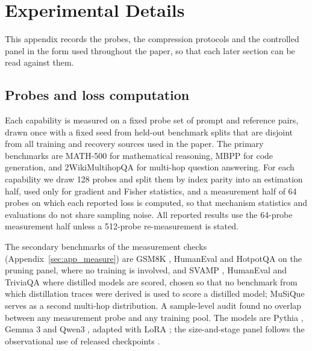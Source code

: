 \section{Experimental Details}
\label{sec:app_details}

This appendix records the probes, the compression protocols and the controlled panel in the form
used throughout the paper, so that each later section can be read against them. 


\subsection{Probes and loss computation}
\label{sec:app_probes}

Each capability is measured on a fixed probe set of prompt and reference pairs, drawn once with a
fixed seed from held-out benchmark splits that are disjoint from all training and recovery sources
used in the paper. The primary benchmarks are MATH-500 \citep{hendrycks2021math,lightman2023verify}
for mathematical reasoning, MBPP \citep{austin2021program} for code generation, and 2WikiMultihopQA
\citep{ho2020constructing} for multi-hop question answering. For each capability we draw 128 probes
and split them by index parity into an estimation half, used only for gradient and Fisher
statistics, and a measurement half of 64 probes on which each reported loss is computed, so that
mechanism statistics and evaluations do not share sampling noise. All reported results use the
64-probe measurement half unless a 512-probe re-measurement is stated.

The secondary benchmarks of the measurement checks (Appendix~\ref{sec:app_measure}) are GSM8K
\citep{cobbe2021gsm8k}, HumanEval \citep{chen2021codex} and HotpotQA \citep{yang2018hotpotqa} on the
pruning panel, where no training is involved, and SVAMP \citep{patel2021svamp}, HumanEval and
TriviaQA \citep{joshi2017triviaqa} where distilled models are scored, chosen so that no benchmark
from which distillation traces were derived is used to score a distilled model; MuSiQue
\citep{trivedi2022musique} serves as a second multi-hop distribution. A sample-level audit found no
overlap between any measurement probe and any training pool. The models are Pythia
\citep{biderman2023pythia}, Gemma 3 \citep{gemma2025gemma3} and Qwen3 \citep{qwen2025qwen3}, adapted
with LoRA \citep{hu2022lora}; the size-and-stage panel follows the observational use of released
checkpoints \citep{ruan2024observational,polo2024tinybenchmarks}.

